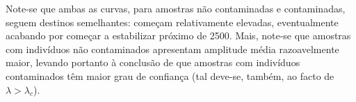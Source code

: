 \documentclass[10pt]{article}
\begin{document}

Note-se que ambas as curvas, para amostras não contaminadas e contaminadas,
seguem destinos semelhantes: começam relativamente elevadas, eventualmente
acabando por começar a estabilizar próximo de 2500. Mais, note-se que amostras
com indivíduos não contaminados apresentam amplitude média razoavelmente maior, levando
portanto à conclusão de que amostras com indivíduos contaminados têm maior grau de confiança
(tal deve-se, também, ao facto de $\lambda > \lambda_c$).
\end{document}
